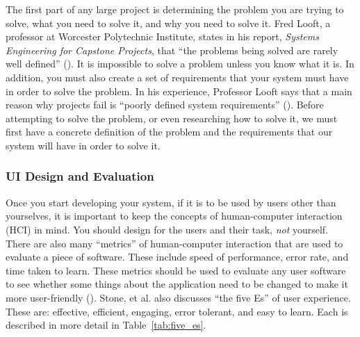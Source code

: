 \begin{doublespace}
The first part of any large project is determining the problem you are trying to solve, what you need to solve it, and why you need to solve it. Fred Looft, a professor at Worcester Polytechnic Institute, states in his report, \emph{Systems Engineering for Capstone Projects}, that ``the problems being solved are rarely well defined'' (\cite[p.~5]{looft_systems_2018}). It is impossible to solve a problem unless you know what it is. In addition, you must also create a set of requirements that your system must have in order to solve the problem. In his experience, Professor Looft says that a main reason why projects fail is ``poorly defined system requirements'' (\cite[p.~24]{looft_systems_2018}). Before attempting to solve the problem, or even researching how to solve it, we must first have a concrete definition of the problem and the requirements that our system will have in order to solve it.

\subsubsection{UI Design and Evaluation}

Once you start developing your system, if it is to be used by users other than yourselves, it is important to keep the concepts of human-computer interaction (HCI) in mind. You should design for the users and their task, \emph{not} yourself. There are also many ``metrics'' of human-computer interaction that are used to evaluate a piece of software. These include speed of performance, error rate, and time taken to learn. These metrics should be used to evaluate any user software to see whether some things about the application need to be changed to make it more user-friendly (\cite[p.~105-106]{stone_user_2005}). Stone, et al. also discusses ``the five Es'' of user experience. These are: effective, efficient, engaging, error tolerant, and easy to learn. Each is described in more detail in Table~\ref{tab:five_es}.


\end{doublespace}
